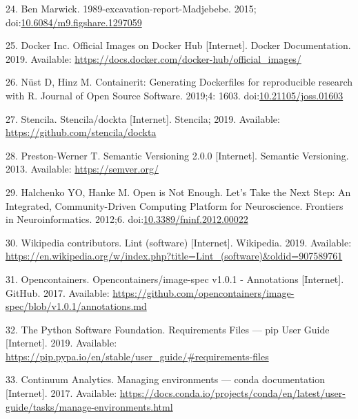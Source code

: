 \documentclass[10pt,letterpaper]{article}
\begin{document}
\leavevmode\hypertarget{ref-marwick_madjebebe_2015}{}%
24. Ben Marwick. 1989-excavation-report-Madjebebe. 2015;
doi:\href{https://doi.org/10.6084/m9.figshare.1297059}{10.6084/m9.figshare.1297059}

\leavevmode\hypertarget{ref-docker_inc_official_2019}{}%
25. Docker Inc. Official Images on Docker Hub {[}Internet{]}. Docker
Documentation. 2019. Available:
\url{https://docs.docker.com/docker-hub/official_images/}

\leavevmode\hypertarget{ref-nust_containerit_2019}{}%
26. Nüst D, Hinz M. Containerit: Generating Dockerfiles for reproducible
research with R. Journal of Open Source Software. 2019;4: 1603.
doi:\href{https://doi.org/10.21105/joss.01603}{10.21105/joss.01603}

\leavevmode\hypertarget{ref-stencila_dockta_2019}{}%
27. Stencila. Stencila/dockta {[}Internet{]}. Stencila; 2019. Available:
\url{https://github.com/stencila/dockta}

\leavevmode\hypertarget{ref-preston-werner_semantic_2013}{}%
28. Preston-Werner T. Semantic Versioning 2.0.0 {[}Internet{]}. Semantic
Versioning. 2013. Available: \url{https://semver.org/}

\leavevmode\hypertarget{ref-halchenko_open_2012}{}%
29. Halchenko YO, Hanke M. Open is Not Enough. Let's Take the Next Step:
An Integrated, Community-Driven Computing Platform for Neuroscience.
Frontiers in Neuroinformatics. 2012;6.
doi:\href{https://doi.org/10.3389/fninf.2012.00022}{10.3389/fninf.2012.00022}

\leavevmode\hypertarget{ref-wikipedia_contributors_lint_2019}{}%
30. Wikipedia contributors. Lint (software) {[}Internet{]}. Wikipedia.
2019. Available:
\url{https://en.wikipedia.org/w/index.php?title=Lint_(software)\&oldid=907589761}

\leavevmode\hypertarget{ref-opencontainers_image-spec_2017}{}%
31. Opencontainers. Opencontainers/image-spec v1.0.1 - Annotations
{[}Internet{]}. GitHub. 2017. Available:
\url{https://github.com/opencontainers/image-spec/blob/v1.0.1/annotations.md}

\leavevmode\hypertarget{ref-the_python_software_foundation_requirements_2019}{}%
32. The Python Software Foundation. Requirements Files --- pip User
Guide {[}Internet{]}. 2019. Available:
\url{https://pip.pypa.io/en/stable/user_guide/\#requirements-files}

\leavevmode\hypertarget{ref-continuum_analytics_managing_2017}{}%
33. Continuum Analytics. Managing environments --- conda documentation
{[}Internet{]}. 2017. Available:
\url{https://docs.conda.io/projects/conda/en/latest/user-guide/tasks/manage-environments.html}
\end{document}
